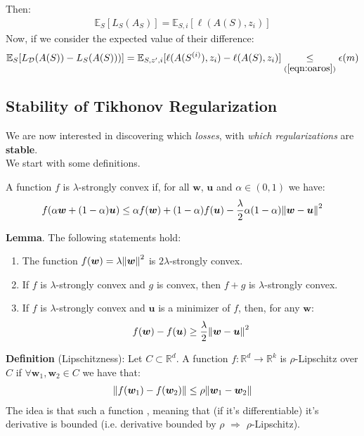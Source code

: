 \documentclass[../template.tex]{subfiles}
\begin{document}
Then:
\begin{align*}
    \mathbb{E}_S[L_S(A_S)] = \mathbb{E}_{S,i}[\ell(A(S), z_i)]
\end{align*}
Now, if we consider the expected value of their difference:
\begin{align*}
    \mathbb{E}_S[L_{\mathcal{D}}(A(S)) - L_S(A(S)))] = \mathbb{E}_{S, z', i}[\ell(A(S^{(i)}), z_i) - \ell(A(S), z_i)] \underset{(\ref{eqn:oaros})}{\leq}  \epsilon(m)
\end{align*}

\subsection{Stability of Tikhonov Regularization}
We are now interested in discovering which \textit{losses}, with \textit{which regularizations} are \textbf{stable}.\\   
We start with some definitions.


A function $f$ is $\lambda$-strongly convex if, for all $\bm{w}$, $\bm{u}$ and $\alpha \in (0,1)$ we have:
\begin{align*}
    f(\alpha \bm{w} + (1-\alpha)\bm{u}) \leq \alpha f(\bm{w}) + (1-\alpha)f(\bm{u}) - \frac{\lambda}{2} \alpha(1-\alpha) \norm{\bm{w}- \bm{u}}^2 
\end{align*}     

\textbf{Lemma}.
The following statements hold:
\begin{enumerate}
    \item The function $f(\bm{w}) = \lambda \norm{\bm{w}}^2$ is $2 \lambda$-strongly convex.
    \item If $f$ is $\lambda$-strongly convex and $g$ is convex, then $f+g$ is $\lambda$-strongly convex.
    \item If $f$ is $\lambda$-strongly convex and $\bm{u}$ is a minimizer of $f$, then, for any $\bm{w}$:
    \begin{align*}
        f(\bm{w}) - f(\bm{u}) \geq \frac{\lambda}{2} \norm{\bm{w} - \bm{u}}^2 
    \end{align*}           
\end{enumerate} 

\textbf{Definition} (Lipschitzness):  
Let $C \subset \mathbb{R}^d$. A function $f\colon \mathbb{R}^d \to \mathbb{R}^k$ is $\rho$-Lipschitz over $C$ if $\forall \bm{w}_1, \bm{w}_2 \in C$ we have that:
\begin{align*}
    \norm{f(\bm{w}_1) - f(\bm{w}_2)} \leq \rho\norm{\bm{w}_1 - \bm{w}_2}
\end{align*}   
The idea is that such a function , meaning that (if it's differentiable) it's derivative is bounded (i.e. derivative bounded by $\rho$ $\Rightarrow$ $\rho$-Lipschitz).
\end{document}
